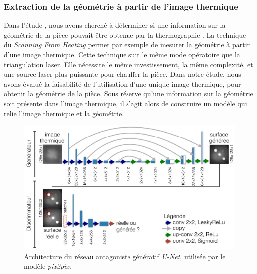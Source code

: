 \subsubsection{Extraction de la géométrie à partir de l'image thermique}
Dans l'étude , nous avons cherché à déterminer si une information sur la géométrie de la pièce pouvait être obtenue par la thermographie \cite{nagorny_generative_2018}.
La technique du \textit{Scanning From Heating} permet par exemple de mesurer la géométrie à partir d'une image thermique.
Cette technique suit le même mode opératoire que la triangulation laser.
Elle nécessite le même investissement, la même complexité, et une source laser plus puissante pour chauffer la pièce.
Dans notre étude, nous avons évalué la faisabilité de l'utilisation d'une unique image thermique, pour obtenir la géométrie de la pièce.
Sous réserve qu'une information sur la géométrie soit présente dans l'image thermique, il s'agit alors de construire un modèle qui relie l'image thermique et la géométrie.

\begin{figure}[tbp]
	\centering
	\includegraphics[width=\textwidth]{../Chap2/Figures/U-Net-architecture-JDD2018.pdf}
	\caption{Architecture du réseau antagoniste génératif \textit{U-Net}, utilisée par le modèle \textit{pix2pix}.}
	\label{fig:pix2pix}
\end{figure}

